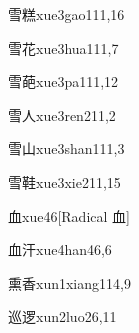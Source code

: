 \begin{entry}{雪糕}{xue3gao1}{11,16}
\end{entry}

\begin{entry}{雪花}{xue3hua1}{11,7}
\end{entry}

\begin{entry}{雪葩}{xue3pa1}{11,12}
\end{entry}

\begin{entry}{雪人}{xue3ren2}{11,2}
\end{entry}

\begin{entry}{雪山}{xue3shan1}{11,3}
\end{entry}

\begin{entry}{雪鞋}{xue3xie2}{11,15}
\end{entry}

\begin{entry}{血}{xue4}{6}[Radical 血]
\end{entry}

\begin{entry}{血汗}{xue4han4}{6,6}
\end{entry}

\begin{entry}{熏香}{xun1xiang1}{14,9}
\end{entry}

\begin{entry}{巡逻}{xun2luo2}{6,11}
\end{entry}



